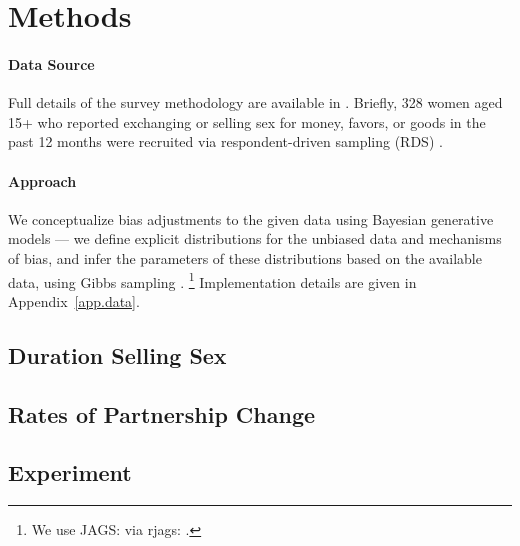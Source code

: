 \section{Methods}\label{meth}
\paragraph{Data Source}
Full details of the survey methodology are available in \cite{Yam2013}.
Briefly, 328 women aged 15+
who reported exchanging or selling sex for money, favors, or goods in the past 12 months
were recruited via respondent-driven sampling (RDS) \cite{Heckathorn1997}.
\paragraph{Approach}
We conceptualize bias adjustments to the given data using Bayesian generative models
--- \ie we define explicit distributions for the unbiased data and mechanisms of bias,
and infer the parameters of these distributions based on the available data,
using Gibbs sampling \cite{Geman1984}.%
\footnote{We use JAGS: 
  via rjags: .}
Implementation details are given in Appendix~\ref{app.data}.

\subsection{Duration Selling Sex}\label{meth.yss}


\subsection{Rates of Partnership Change}\label{meth.parts}

\subsection{Experiment}\label{meth.exp}
